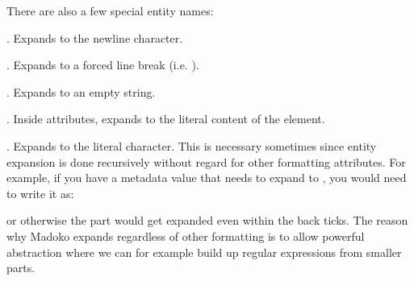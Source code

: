 \documentclass{book}
\begin{document}
\begin{mdP}[class={para-continue},data-line={2407}]%
{}There are also a few special entity names:%
\end{mdP}%
\begin{mdUl}[class={list-star,compact},data-line={2409}]%
\begin{mdLi}[data-line={2409}]%
{}%
{}. Expands to the newline character.%
\end{mdLi}%
\begin{mdLi}[data-line={2410}]%
{}%
{}. Expands to a forced line break (i.e. %
{}%
{}).%
\end{mdLi}%
\begin{mdLi}[data-line={2411}]%
{}%
{}. Expands to an empty string.%
\end{mdLi}%
\begin{mdLi}[data-line={2412}]%
{}%
{}. Inside attributes, expands to the literal content of the element.%
\end{mdLi}%
\begin{mdLi}[data-line={2413}]%
{}\mdCode[class={code,code1}]{{\&}{\&};}%
{}. Expands to the literal %
{}\mdCode[class={code,code1}]{{\&}}%
{} character. This is necessary
  sometimes since entity expansion is done recursively without regard for other
  formatting attributes. For example, if you have a metadata value %
{}%
{} that
  needs to expand to %
{}%
{}, you would need to write it as:
\begin{mdPre}[class={para-block,pre-fenced},data-line={2417},data-line-code={2418}]%
%
\end{mdPre}%
{}  or otherwise the %
{}%
{} part would get expanded even within the back ticks.
  The reason why Madoko expands regardless of other formatting is to allow powerful
  abstraction where we can for example build up regular expressions from smaller parts.%
\end{mdLi}%
\end{mdUl}%
\end{document}
